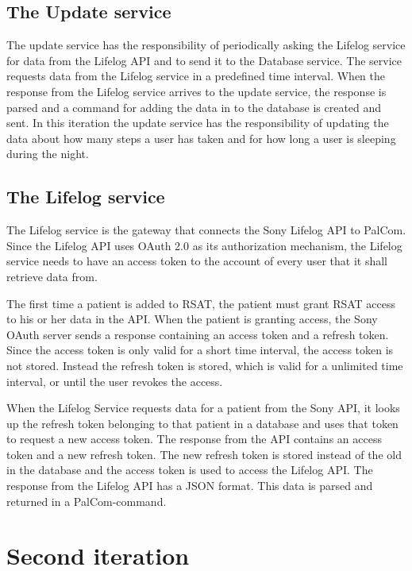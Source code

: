\documentclass{cslthse-msc}
\begin{document}
\subsection{The Update service}

The update service has the responsibility of periodically asking the Lifelog service for data from the Lifelog API and to send it to the Database service. The service requests data from the Lifelog service in a predefined time interval. When the response from the Lifelog service arrives to the update service, the response is parsed and a command for adding the data in to the database is created and sent. In this iteration the update service has the responsibility of updating the data about how many steps a user has taken and for how long a user is sleeping during the night.

\subsection{The Lifelog service}

The Lifelog service is the gateway that connects the Sony Lifelog API to PalCom. Since the Lifelog API uses OAuth 2.0 as its authorization mechanism, the Lifelog service needs to have an access token to the account of every user that it shall retrieve data from. 

The first time a patient is added to RSAT, the patient must grant RSAT access to his or her data in the API. When the patient is granting access, the Sony OAuth server sends a response containing an access token and a refresh token.  Since the access token is only valid for a short time interval, the access token is not stored. Instead the refresh token is stored, which is valid for a unlimited time interval, or until the user revokes the access. 

When the Lifelog Service requests data for a patient from the Sony API, it looks up the refresh token belonging to that patient in a database and uses that token to request a new access token. The response from the API contains an access token and a new refresh token. The new refresh token is stored instead of the old in the database and the access token is used to access the Lifelog API. The response from the Lifelog API has a JSON format. This data is parsed and returned in a PalCom-command.



\section{Second iteration}
\end{document}
